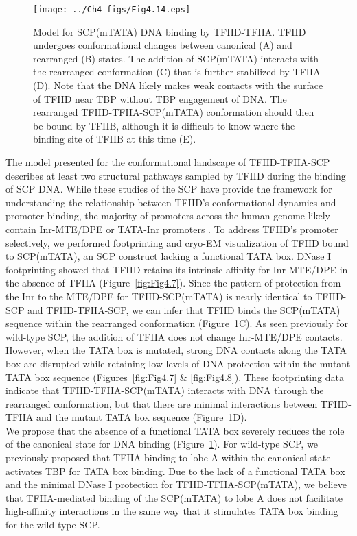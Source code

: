 \begin{figure}
\centering
\texttt{[image: ../Ch4\_figs/Fig4.14.eps]}
\caption[Model for SCP(mTATA) DNA binding by TFIID-TFIIA]{Model for SCP(mTATA) DNA binding by TFIID-TFIIA. TFIID undergoes conformational changes between canonical (A) and rearranged (B) states. The addition of SCP(mTATA) interacts with the rearranged conformation (C) that is further stabilized by TFIIA (D). Note that the DNA likely makes weak contacts with the surface of TFIID near TBP without TBP engagement of DNA. The rearranged TFIID-TFIIA-SCP(mTATA) conformation should then be bound by TFIIB, although it is difficult to know where the binding site of TFIIB at this time (E).}
\label{fig:Fig4.14}
\end{figure}

The model presented for the conformational landscape of TFIID-TFIIA-SCP describes at least two structural pathways sampled by TFIID during the binding of SCP DNA. While these studies of the SCP have provide the framework for understanding the relationship between TFIID's conformational dynamics and promoter binding, the majority of promoters across the human genome likely contain Inr-MTE/DPE or TATA-Inr promoters \cite{Juven-Gershon_468}. To address TFIID's promoter selectively, we performed footprinting and cryo-EM visualization of TFIID bound to SCP(mTATA), an SCP construct lacking a functional TATA box. DNase I footprinting showed that TFIID retains its intrinsic affinity for Inr-MTE/DPE in the absence of TFIIA (Figure~\ref{fig:Fig4.7}). Since the pattern of protection from the Inr to the MTE/DPE for TFIID-SCP(mTATA) is nearly identical to TFIID-SCP and TFIID-TFIIA-SCP, we can infer that TFIID binds the SCP(mTATA) sequence within the rearranged conformation (Figure~\ref{fig:Fig4.14}C). As seen previously for wild-type SCP, the addition of TFIIA does not change Inr-MTE/DPE contacts. However, when the TATA box is mutated, strong DNA contacts along the TATA box are disrupted while retaining low levels of DNA protection within the mutant TATA box sequence (Figures~\ref{fig:Fig4.7} \& \ref{fig:Fig4.8}). These footprinting data indicate that TFIID-TFIIA-SCP(mTATA) interacts with DNA through the rearranged conformation, but that there are minimal interactions between TFIID-TFIIA and the mutant TATA box sequence (Figure~\ref{fig:Fig4.14}D).   \\
\indent We propose that the absence of a functional TATA box severely reduces the role of the canonical state for DNA binding (Figure~\ref{fig:Fig4.14}). For wild-type SCP, we previously proposed that TFIIA binding to lobe A within the canonical state activates TBP for TATA box binding. Due to the lack of a functional TATA box and the minimal DNase I protection for TFIID-TFIIA-SCP(mTATA), we believe that TFIIA-mediated binding of the SCP(mTATA) to lobe A does not facilitate high-affinity interactions in the same way that it stimulates TATA box binding for the wild-type SCP.\\
